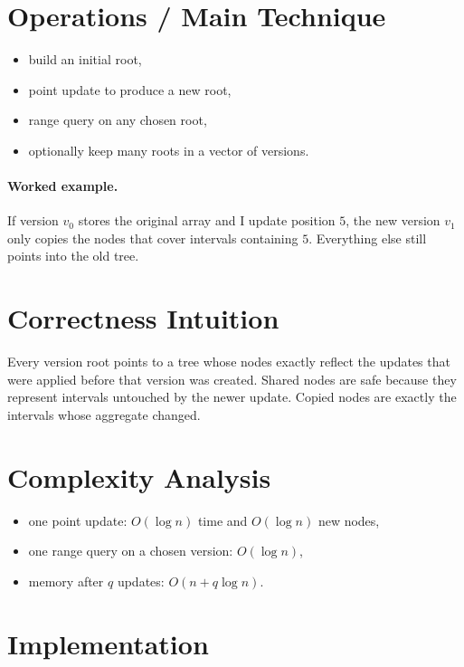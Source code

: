 \section*{Operations / Main Technique}

\begin{itemize}
  \item build an initial root,
  \item point update to produce a new root,
  \item range query on any chosen root,
  \item optionally keep many roots in a vector of versions.
\end{itemize}

\paragraph{Worked example.}
If version \(v_0\) stores the original array and I update position \(5\), the new version \(v_1\) only copies the
nodes that cover intervals containing \(5\). Everything else still points into the old tree.

\section*{Correctness Intuition}

Every version root points to a tree whose nodes exactly reflect the updates that were applied before that version was
created. Shared nodes are safe because they represent intervals untouched by the newer update. Copied nodes are exactly
the intervals whose aggregate changed.

\section*{Complexity Analysis}

\begin{itemize}
  \item one point update: \(O(\log n)\) time and \(O(\log n)\) new nodes,
  \item one range query on a chosen version: \(O(\log n)\),
  \item memory after \(q\) updates: \(O(n + q \log n)\).
\end{itemize}

\section*{Implementation}

